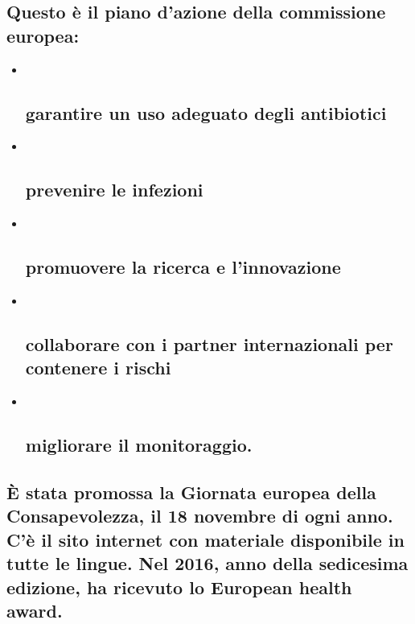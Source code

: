 \documentclass[]{article}
\begin{document}
\subsection{Questo è il piano d'azione della commissione
europea:}\label{questo-uxe8-il-piano-dazione-della-commissione-europea}

\begin{itemize}
\item ~
  \subsection{garantire un uso adeguato degli
  antibiotici}\label{garantire-un-uso-adeguato-degli-antibiotici}
\item ~
  \subsection{prevenire le infezioni}\label{prevenire-le-infezioni-1}
\item ~
  \subsection{promuovere la ricerca e
  l'innovazione}\label{promuovere-la-ricerca-e-linnovazione}
\item ~
  \subsection{collaborare con i partner internazionali per contenere i
  rischi}\label{collaborare-con-i-partner-internazionali-per-contenere-i-rischi}
\item ~
  \subsection{migliorare il
  monitoraggio.}\label{migliorare-il-monitoraggio.}
\end{itemize}

\subsection{\texorpdfstring{È stata promossa la \textbf{Giornata europea
della Consapevolezza}, il 18 novembre di ogni anno. C'è il sito internet
con materiale disponibile in tutte le lingue. Nel 2016, anno della
sedicesima edizione, ha ricevuto lo European health
award.}{È stata promossa la Giornata europea della Consapevolezza, il 18 novembre di ogni anno. C'è il sito internet con materiale disponibile in tutte le lingue. Nel 2016, anno della sedicesima edizione, ha ricevuto lo European health award.}}\label{uxe8-stata-promossa-la-giornata-europea-della-consapevolezza-il-18-novembre-di-ogni-anno.-cuxe8-il-sito-internet-con-materiale-disponibile-in-tutte-le-lingue.-nel-2016-anno-della-sedicesima-edizione-ha-ricevuto-lo-european-health-award.}
\end{document}
